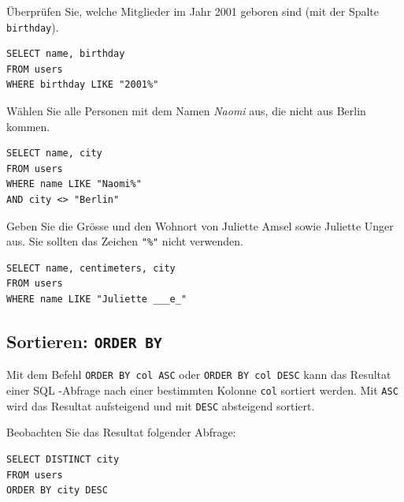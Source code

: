 \begin{mychallenge}
  Überprüfen Sie, welche Mitglieder im Jahr 2001 geboren sind (mit der Spalte \texttt{birthday}).
  \begin{myanswer}
    \begin{lstlisting}[style=sql]
SELECT name, birthday
FROM users
WHERE birthday LIKE "2001%"
\end{lstlisting}
  \end{myanswer}
\end{mychallenge}

\begin{myexercise}
  Wählen Sie alle Personen mit dem Namen \textit{Naomi} aus, die nicht aus Berlin kommen.
  \begin{myanswer}
    \begin{lstlisting}[style=sql]
SELECT name, city
FROM users
WHERE name LIKE "Naomi%"
AND city <> "Berlin"
\end{lstlisting}
  \end{myanswer}
\end{myexercise}

\begin{mychallenge}
  Geben Sie die Grösse und den Wohnort von Juliette Amsel sowie Juliette Unger aus. Sie sollten das Zeichen \lstinline[style=sql]|"%"| nicht verwenden.
  \begin{myanswer}
    \begin{lstlisting}[style=sql]
SELECT name, centimeters, city
FROM users
WHERE name LIKE "Juliette ___e_"
\end{lstlisting}
  \end{myanswer}
\end{mychallenge}

\subsection{Sortieren: \texorpdfstring{\lstinline[style=sql]|ORDER BY|}{ORDER BY}}

Mit dem Befehl \lstinline[style=sql]|ORDER BY col ASC| oder \lstinline[style=sql]|ORDER BY col DESC| kann das Resultat einer \gls{SQL} -Abfrage nach einer bestimmten Kolonne \lstinline[style=sql]|col| sortiert werden. Mit \lstinline[style=sql]|ASC| wird das Resultat aufsteigend und mit \lstinline[style=sql]|DESC| absteigend sortiert.

\begin{myexample}
Beobachten Sie das Resultat folgender Abfrage:

\begin{lstlisting}[style=sql]
SELECT DISTINCT city 
FROM users 
ORDER BY city DESC
\end{lstlisting}
\end{myexample}

